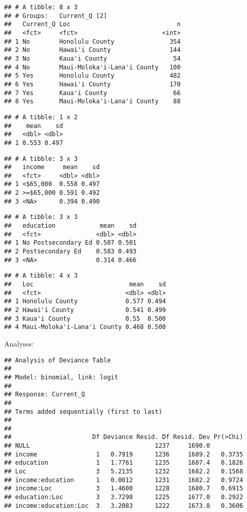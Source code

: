 \documentclass[]{article}
\begin{document}
\begin{verbatim}
## # A tibble: 8 x 3
## # Groups:   Current_Q [2]
##   Current_Q Loc                             n
##   <fct>     <fct>                       <int>
## 1 No        Honolulu County               354
## 2 No        Hawai'i County                144
## 3 No        Kaua'i County                  54
## 4 No        Maui-Moloka'i-Lana'i County   100
## 5 Yes       Honolulu County               482
## 6 Yes       Hawai'i County                170
## 7 Yes       Kaua'i County                  66
## 8 Yes       Maui-Moloka'i-Lana'i County    88
\end{verbatim}

\begin{verbatim}
## # A tibble: 1 x 2
##    mean    sd
##   <dbl> <dbl>
## 1 0.553 0.497
\end{verbatim}

\begin{verbatim}
## # A tibble: 3 x 3
##   income     mean    sd
##   <fct>     <dbl> <dbl>
## 1 <$65,000  0.558 0.497
## 2 >=$65,000 0.591 0.492
## 3 <NA>      0.394 0.490
\end{verbatim}

\begin{verbatim}
## # A tibble: 3 x 3
##   education            mean    sd
##   <fct>               <dbl> <dbl>
## 1 No Postsecondary Ed 0.507 0.501
## 2 Postsecondary Ed    0.583 0.493
## 3 <NA>                0.314 0.466
\end{verbatim}

\begin{verbatim}
## # A tibble: 4 x 3
##   Loc                          mean    sd
##   <fct>                       <dbl> <dbl>
## 1 Honolulu County             0.577 0.494
## 2 Hawai'i County              0.541 0.499
## 3 Kaua'i County               0.55  0.500
## 4 Maui-Moloka'i-Lana'i County 0.468 0.500
\end{verbatim}

Analyses:

\begin{verbatim}
## Analysis of Deviance Table
## 
## Model: binomial, link: logit
## 
## Response: Current_Q
## 
## Terms added sequentially (first to last)
## 
## 
##                      Df Deviance Resid. Df Resid. Dev Pr(>Chi)
## NULL                                  1237     1690.0         
## income                1   0.7919      1236     1689.2   0.3735
## education             1   1.7761      1235     1687.4   0.1826
## Loc                   3   5.2135      1232     1682.2   0.1568
## income:education      1   0.0012      1231     1682.2   0.9724
## income:Loc            3   1.4600      1228     1680.7   0.6915
## education:Loc         3   3.7298      1225     1677.0   0.2922
## income:education:Loc  3   3.2083      1222     1673.8   0.3606
\end{verbatim}
\end{document}
